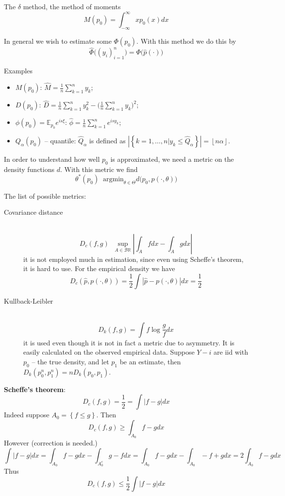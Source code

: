 \documentclass[a4paper]{article}
\newcommand{\obj}[1]{{\left\{ #1 \right \}}}
\newcommand{\induc}[1]{{\left . #1 \right \vert}}
\newcommand{\abs}[1]{{\left | #1 \right |}}
\newcommand{\floor}[1]{{\left\lfloor #1 \right\rfloor}}
\newcommand{\Real}{\mathbb{R}}
\newcommand{\borel}{\mathcal{B}}
\newcommand{\ex}{\mathbb{E}}
\newcommand{\defn}{\mathop{\overset{\Delta}{=}}\nolimits}
\begin{document}
The $\delta$ method, the method of moments
\[M(p_0) = \int_{-\infty}^\infty x p_0(x) dx\]

In general we wish to estimate some $\Phi(p_0)$. With this method we do this by
\[\hat{\Phi}\big((y_i)_{i=1}^n\big) = \Phi\big(\hat{p}(\cdot)\big)\]

Examples
\begin{itemize}
	\item $M(p_0)$: $\hat{M} = \frac{1}{n}\sum_{k=1}^n y_k$;
	\item $D(p_0)$: $\hat{D} = \frac{1}{n}\sum_{k=1}^n y_k^2 - \big(\frac{1}{n}\sum_{k=1}^n y_k\big)^2$;
	\item $\phi(p_0) = \ex_{p_0} e^{is\xi}$: $\hat{\phi} = \frac{1}{n}\sum_{k=1}^n e^{isy_k}$;
	\item $Q_\alpha(p_0)$ -- quantile: $\hat{Q}_\alpha$ is defined as $\abs{\obj{\induc{k=1,\ldots,n} y_k \leq \hat{Q}_\alpha}} = \floor{n\alpha}$.
\end{itemize}

In order to understand how well $p_0$ is approximated, we need a metric on the density functions $d$. With this metric we find
\[\theta^*(p_0) \defn \text{argmin}_{\theta \in\Theta} d\Big(p_0, p(\cdot,\theta)\Big) \]

The list of possible metrics: \begin{description}
	\item[Covariance distance]\hfill \\
	\[D_c(f,g)\defn \sup_{A\in \borel{\Real}} \abs{\int_A f dx - \int_A g dx}\]
	it is not employed much in estimation, since even using Scheffe's theorem, it is hard to use.
	For the empirical density we have
	\[D_c(\hat{p}, p(\cdot,\theta)) = \frac{1}{2} \int \abs{\hat{p} - p(\cdot,\theta)}dx = \frac{1}{2}\]
	\item[Kullback-Leibler]\hfill \\
	\[D_k(f,g) = \int f \log \frac{g}{f} dx\]
	it is used even though it is not in fact a metric due to asymmetry.
	It is easily calculated on the observed empirical data.
	Suppose $Y-i$ are iid with $p_0$ -- the true density, and let $p_1$ be an estimate, then $D_k(p_0^n, p_1^n) = nD_k(p_0,p_1)$.
\end{description}

\noindent\textbf{Scheffe's theorem}:
\[D_c(f,g) = \frac{1}{2} = \int \abs{f-g}dx\]
Indeed suppose $A_0 = \obj{ f\leq g }$. Then
\[D_c(f,g)\geq \int_{A_0} f-g dx\]
However (correction is needed.)
\[\int \abs{f-g} dx = \int_{A_0} f-g dx - \int_{A_0^c} g-f dx = \int_{A_0} f-g dx  - \int_{A_0} -f+g dx = 2\int_{A_0} f-g dx \]
Thus 
\[D_c(f,g)\leq \frac{1}{2} \int \abs{f-g} dx \]
\end{document}

